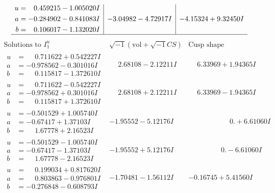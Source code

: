 \documentclass[1p]{elsarticle_modified}
\theoremstyle{definition}
\newcommand{\I}{\sqrt{-1}}
\begin{document}
$$\begin{array}{c|c|c}
\begin{aligned}
u &= \phantom{-}0.459215 - 1.005020 I \\
a &= -0.284902 - 0.841083 I \\
b &= \phantom{-}0.106017 - 1.132020 I\end{aligned}
 & -3.04982 - 4.72917 I & -4.15324 + 9.32450 I\\
 \hline 
 \end{array}$$\newpage$$\begin{array}{c|c|c}  
\text{Solutions to }I^u_{1}& \I (\text{vol} + \sqrt{-1}CS) & \text{Cusp shape}\\
 \hline 
\begin{aligned}
u &= \phantom{-}0.711622 + 0.542227 I \\
a &= -0.978562 - 0.301016 I \\
b &= \phantom{-}0.115817 - 1.372610 I\end{aligned}
 & \phantom{-}2.68108 - 2.12211 I & \phantom{-}6.33969 + 1.94365 I \\ \hline\begin{aligned}
u &= \phantom{-}0.711622 - 0.542227 I \\
a &= -0.978562 + 0.301016 I \\
b &= \phantom{-}0.115817 + 1.372610 I\end{aligned}
 & \phantom{-}2.68108 + 2.12211 I & \phantom{-}6.33969 - 1.94365 I \\ \hline\begin{aligned}
u &= -0.501529 + 1.005740 I \\
a &= -0.67417 + 1.37103 I \\
b &= \phantom{-}1.67778 + 2.16523 I\end{aligned}
 & -1.95552 - 5.12176 I & \phantom{-0.000000 -}0. + 6.61060 I \\ \hline\begin{aligned}
u &= -0.501529 - 1.005740 I \\
a &= -0.67417 - 1.37103 I \\
b &= \phantom{-}1.67778 - 2.16523 I\end{aligned}
 & -1.95552 + 5.12176 I & \phantom{-0.000000 } 0. - 6.61060 I \\ \hline\begin{aligned}
u &= \phantom{-}0.199034 + 0.817620 I \\
a &= \phantom{-}0.803863 - 0.976801 I \\
b &= -0.276848 - 0.608793 I\end{aligned}
 & -1.70481 - 1.56112 I & -0.16745 + 5.41560 I \\ \hline\begin{aligned}

\end{aligned}
\end{array}$$
\end{document}
